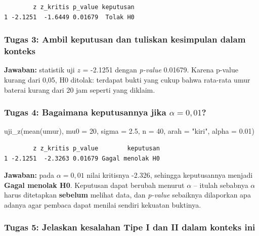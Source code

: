 \documentclass[
  indonesian,
  letterpaper,
]{book}
\newenvironment{Shaded}{\begin{snugshade}}{\end{snugshade}}
\newcommand{\AttributeTok}[1]{\textcolor[rgb]{0.40,0.45,0.13}{#1}}
\newcommand{\DecValTok}[1]{\textcolor[rgb]{0.68,0.00,0.00}{#1}}
\newcommand{\FloatTok}[1]{\textcolor[rgb]{0.68,0.00,0.00}{#1}}
\newcommand{\FunctionTok}[1]{\textcolor[rgb]{0.28,0.35,0.67}{#1}}
\newcommand{\NormalTok}[1]{\textcolor[rgb]{0.00,0.23,0.31}{#1}}
\newcommand{\StringTok}[1]{\textcolor[rgb]{0.13,0.47,0.30}{#1}}
\begin{document}
\begin{verbatim}
        z z_kritis p_value keputusan
1 -2.1251  -1.6449 0.01679  Tolak H0
\end{verbatim}

\subsubsection{Tugas 3: Ambil keputusan dan tuliskan kesimpulan dalam
konteks}\label{tugas-3-ambil-keputusan-dan-tuliskan-kesimpulan-dalam-konteks}

\textbf{Jawaban:} statistik uji \(z\) = -2.1251 dengan \emph{p-value}
0.01679. Karena p-value kurang dari 0,05, H0 ditolak: terdapat bukti
yang cukup bahwa rata-rata umur baterai kurang dari 20 jam seperti yang
diklaim.

\subsubsection{\texorpdfstring{Tugas 4: Bagaimana keputusannya jika
\(\alpha = 0{,}01\)?}{Tugas 4: Bagaimana keputusannya jika \textbackslash alpha = 0\{,\}01?}}\label{tugas-4-bagaimana-keputusannya-jika-alpha-001}

\begin{Shaded}
\begin{Highlighting}[]
\FunctionTok{uji\_z}\NormalTok{(}\FunctionTok{mean}\NormalTok{(umur), }\AttributeTok{mu0 =} \DecValTok{20}\NormalTok{, }\AttributeTok{sigma =} \FloatTok{2.5}\NormalTok{, }\AttributeTok{n =} \DecValTok{40}\NormalTok{, }\AttributeTok{arah =} \StringTok{"kiri"}\NormalTok{, }\AttributeTok{alpha =} \FloatTok{0.01}\NormalTok{)}
\end{Highlighting}
\end{Shaded}

\begin{verbatim}
        z z_kritis p_value        keputusan
1 -2.1251  -2.3263 0.01679 Gagal menolak H0
\end{verbatim}

\textbf{Jawaban:} pada \(\alpha = 0{,}01\) nilai kritisnya -2.326,
sehingga keputusannya menjadi \textbf{Gagal menolak H0}. Keputusan dapat
berubah menurut \(\alpha\) -- itulah sebabnya \(\alpha\) harus
ditetapkan \textbf{sebelum} melihat data, dan \emph{p-value} sebaiknya
dilaporkan apa adanya agar pembaca dapat menilai sendiri kekuatan
buktinya.

\subsubsection{Tugas 5: Jelaskan kesalahan Tipe I dan II dalam konteks
ini}\label{tugas-5-jelaskan-kesalahan-tipe-i-dan-ii-dalam-konteks-ini}
\end{document}
